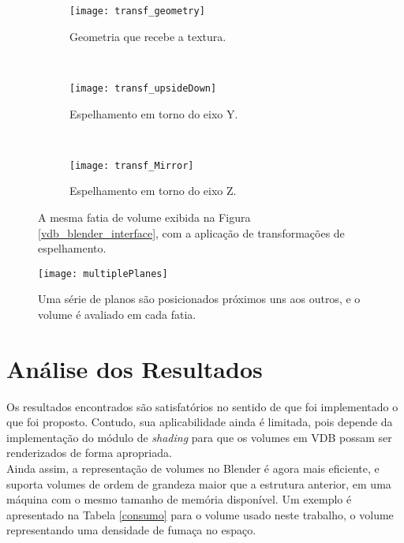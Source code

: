 \begin{figure}[!htb]
        \centering
        \begin{subfigure}{0.3\textwidth}
                \texttt{[image: transf\_geometry]}
                \caption{Geometria que recebe a textura.}
                \label{fig:vdb_trans1}
        \end{subfigure}%
        ~ %
        \begin{subfigure}{0.3\textwidth}
                \texttt{[image: transf\_upsideDown]}
                \caption{Espelhamento em torno do eixo Y.}
                \label{fig:vdb_trans2}
        \end{subfigure}
        ~ %
        \begin{subfigure}{0.3\textwidth}
                \texttt{[image: transf\_Mirror]}
                \caption{Espelhamento em torno do eixo Z.}
                \label{fig:vdb_trans3}
        \end{subfigure}
        \caption{A mesma fatia de volume exibida na Figura \ref{vdb_blender_interface}, com a aplicação de transformações de espelhamento.}\label{fig:vdb_trans}
\end{figure}


\begin{figure}[!htb]
\center
\texttt{[image: multiplePlanes]}
\caption{Uma série de planos são posicionados próximos uns aos outros, e o volume é avaliado em cada fatia.}
\label{planes}
\end{figure}

\section*{Análise dos Resultados}

Os resultados encontrados são satisfatórios no sentido de que foi implementado o que foi proposto. Contudo, sua aplicabilidade ainda é limitada, pois depende da implementação do módulo de \emph{shading} para que os volumes em VDB possam ser renderizados de forma apropriada.\\

Ainda assim, a representação de volumes no Blender é agora mais eficiente, e suporta volumes de ordem de grandeza maior que a estrutura anterior, em uma máquina com o mesmo tamanho de memória disponível. Um exemplo é apresentado na Tabela \ref{consumo} para o volume usado neste trabalho, o volume representando uma densidade de fumaça no espaço.


